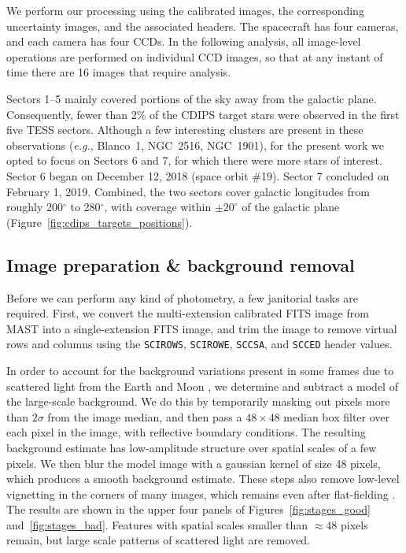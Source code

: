 \documentclass[12pt,twocolumn,tighten,trackchanges]{aastex62}
\begin{document}
We perform our processing using the calibrated images, the
corresponding uncertainty images, and the associated headers.  The
spacecraft has four cameras, and each camera has four CCDs.  In the
following analysis, all image-level operations are performed on
individual CCD images, so that at any instant of time there are 16
images that require analysis.

Sectors 1--5 mainly covered portions of the sky away from the galactic
plane.  Consequently, fewer than 2\% of the CDIPS target stars were
observed in the first five TESS sectors.  Although a few interesting
clusters are present in these observations ({\it e.g.}, Blanco~1,
NGC~2516, NGC~1901), for the present work we opted to focus on Sectors
6 and 7, for which there were more stars of interest.  Sector 6
began on December 12, 2018 (space orbit \#19). Sector 7 concluded
on February 1, 2019. Combined, the two sectors
cover galactic longitudes from roughly 200$^\circ$ to 280$^\circ$,
with coverage within $\pm 20^\circ$ of the galactic plane
(Figure~\ref{fig:cdips_targets_positions}).


\subsection{Image preparation \& background removal}
\label{subsec:preparation}

Before we can perform any kind of photometry, a few janitorial tasks
are required.  First, we convert the multi-extension calibrated FITS
image from MAST into a single-extension FITS image, and trim the image
to remove virtual rows and columns using the \texttt{SCIROWS},
\texttt{SCIROWE}, \texttt{SCCSA}, and \texttt{SCCED} header values.

In order to account for the background variations present in some
frames due to scattered light from the Earth and Moon \citep[see][\S
7.3.1--7.3.4]{vanderspek_2018}, we determine and subtract a model of
the large-scale background.  We do this by temporarily masking out
pixels more than $2\sigma$ from the image median, and then pass a
$48\times48$ median box filter over each pixel in the image, with
reflective boundary conditions.  The resulting background estimate has
low-amplitude structure over spatial scales of a few pixels. We then
blur the model image with a gaussian kernel of size 48 pixels, which
produces a smooth background estimate.  These steps also remove
low-level vignetting in the corners of many images, which remains even
after flat-fielding \citep[see][\S 7.3.5]{vanderspek_2018}.  The
results are shown in the upper four panels of
Figures~\ref{fig:stages_good} and~\ref{fig:stages_bad}.  Features with
spatial scales smaller than $\approx$48 pixels remain, but large scale
patterns of scattered light are removed.
\end{document}
